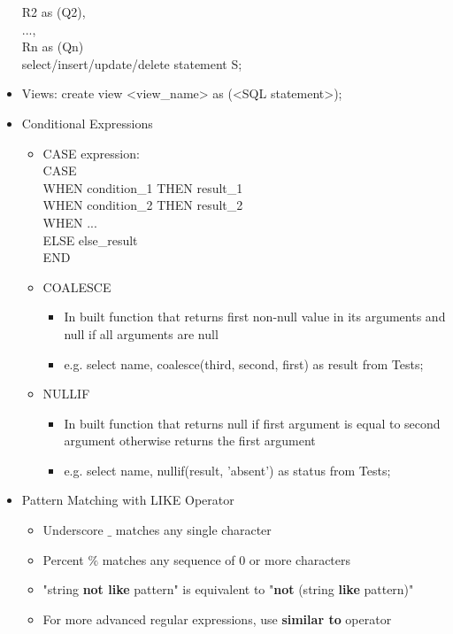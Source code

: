 \documentclass[10pt,landscape,a4paper]{scrartcl}
\begin{document}
\begin{multicols*}{4}
\begin{itemize}
        R2 as (Q2), \\
        ..., \\
        Rn as (Qn) \\
        select/insert/update/delete statement S; \\
      \item Views: create view <view\_name> as (<SQL statement>);
      \item Conditional Expressions
      \begin{itemize}
          \item CASE expression: \\
          CASE \\
              WHEN condition\_1  THEN result\_1 \\
              WHEN condition\_2  THEN result\_2 \\
              WHEN ...\, \\
              ELSE else\_result \\
          END
          \item COALESCE
          \begin{itemize}
            \item In built function that returns first non-null value in its arguments and null if all arguments are null
            \item e.g. select name, coalesce(third, second, first) as result from Tests;
          \end{itemize}
          \item NULLIF
          \begin{itemize}
            \item In built function that returns null if first argument is equal to second argument otherwise returns the first argument
            \item e.g. select name, nullif(result, 'absent') as status from Tests;
          \end{itemize}
      \end{itemize}
      \item Pattern Matching with LIKE Operator
      \begin{itemize}
          \item Underscore $\_$ matches any single character
          \item Percent $\%$ matches any sequence of 0 or more characters
          \item "string \textbf{not like} pattern" is equivalent to "\textbf{not} (string \textbf{like} pattern)"
          \item For more advanced regular expressions, use \textbf{similar to} operator
      \end{itemize}
  \end{itemize}

\end{multicols*}
\end{document}
